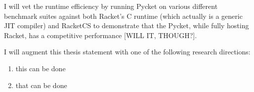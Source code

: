 \begin{itemize}
    I will vet the runtime efficiency by running Pycket on various
    different benchmark suites against both Racket's C runtime (which
    actually is a generic JIT compiler) and RacketCS to demonstrate
    that the Pycket, while fully hosting Racket, has a competitive
    performance [WILL IT, THOUGH?].
\end{itemize}

I will augment this thesis statement with one of the following research directions:

\begin{enumerate}
  \item this can be done
  \item that can be done
\end{enumerate}
